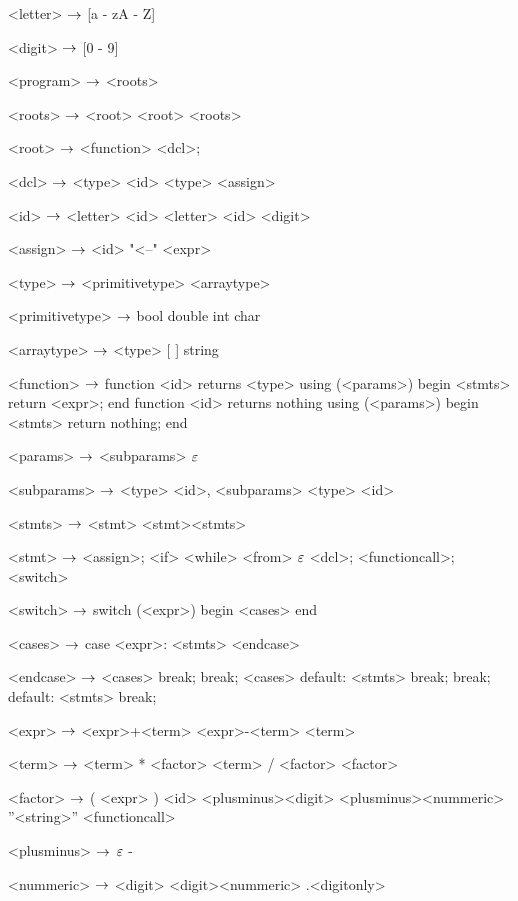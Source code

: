 



\begin{grammar}
<letter> $\rightarrow$ [a - zA - Z]

<digit> $\rightarrow$ [0 - 9]

<program> $\rightarrow$ <roots>

<roots> $\rightarrow$ <root>
\alt <root> <roots>

<root> $\rightarrow$ <function>
\alt <dcl>;

<dcl> $\rightarrow$ <type> <id>
\alt <type> <assign>

<id> $\rightarrow$ <letter>
	\alt<id> <letter>
	\alt<id> <digit>

<assign>  $\rightarrow$ <id> "<--" <expr>

<type> $\rightarrow$ <primitivetype>
\alt <arraytype>

<primitivetype> $\rightarrow$ bool
\alt double
\alt int
\alt char

<arraytype> $\rightarrow$ <type> [ ]
\alt string

<function> $\rightarrow$  function <id> returns <type> using (<params>)
begin
	<stmts>
	return <expr>;
end
\alt function <id> returns nothing using (<params>)
begin
	<stmts>
	return nothing;
end

<params> $\rightarrow$ <subparams>
	\alt $\varepsilon$

<subparams> $\rightarrow$ <type> <id>, <subparams>
\alt <type> <id>

<stmts> $\rightarrow$ <stmt>
	\alt <stmt><stmts>

<stmt> $\rightarrow$ <assign>;
	\alt <if>
	\alt <while>
	\alt <from>
	\alt $\varepsilon$
	\alt <dcl>;
	\alt <functioncall>;
	\alt <switch>

<switch> $\rightarrow$ switch (<expr>)
		begin
			<cases>
		end

<cases> $\rightarrow$ case <expr>:
			<stmts>
		<endcase>
		
<endcase> $\rightarrow$ <cases>
		\alt break;
		\alt break;
		<cases>
		\alt default:
			<stmts>
			break;
		\alt break;
		default:
			<stmts>
			break;

<expr> $\rightarrow$ <expr>+<term>
	\alt<expr>-<term>
	\alt<term>

<term> $\rightarrow$ <term> * <factor>
	\alt <term> / <factor>
	\alt <factor>

<factor> $\rightarrow$ ( <expr> )
	\alt <id>
	\alt <plusminus><digit>
	\alt <plusminus><nummeric>
	\alt ''<string>''
	\alt <functioncall> 

<plusminus> $\rightarrow$ $\varepsilon$
	\alt -

<nummeric> $\rightarrow$ <digit>
	\alt <digit><nummeric>
	\alt .<digitonly>


\end{grammar}
